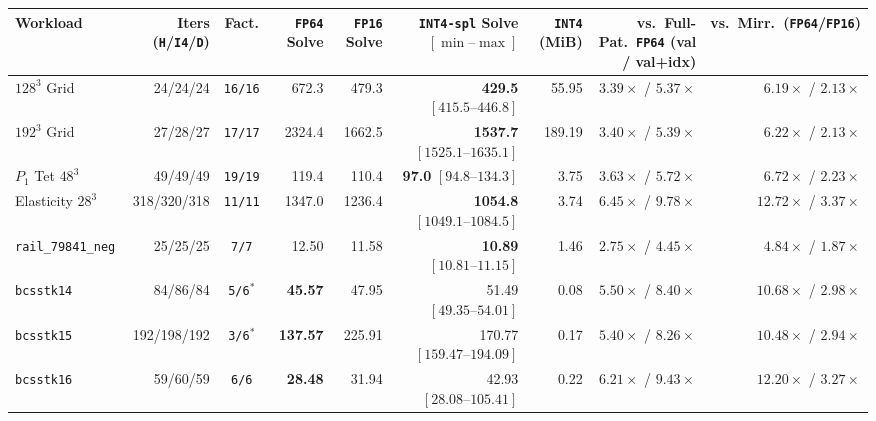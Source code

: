 \documentclass[10pt]{article}
\begin{document}
\begin{table}[t]
\centering\scriptsize
\begin{tabular}{@{}lrcrrrrrr@{}}
\toprule
Workload & Iters (\texttt{H}/\texttt{I4}/\texttt{D}) & Fact. & \texttt{FP64} Solve & \texttt{FP16} Solve & \texttt{INT4-spl} Solve $[\min\text{--}\max]$ & \texttt{INT4} (MiB) & vs.\ Full-Pat.\ \texttt{FP64} (val / val+idx) & vs.\ Mirr.\ (\texttt{FP64}/\texttt{FP16}) \\
\midrule
$128^3$ Grid & 24/24/24 & \texttt{16/16} & 672.3 & 479.3 & \textbf{429.5} $[415.5\text{--}446.8]$ & 55.95 & $\mathbf{3.39\times}$ / $\mathbf{5.37\times}$ & $6.19\times$ / $2.13\times$ \\
$192^3$ Grid & 27/28/27 & \texttt{17/17} & 2324.4 & 1662.5 & \textbf{1537.7} $[1525.1\text{--}1635.1]$ & 189.19 & $\mathbf{3.40\times}$ / $\mathbf{5.39\times}$ & $6.22\times$ / $2.13\times$ \\
$P_1$ Tet $48^3$ & 49/49/49 & \texttt{19/19} & 119.4 & 110.4 & \textbf{97.0} $[94.8\text{--}134.3]$ & 3.75 & $\mathbf{3.63\times}$ / $\mathbf{5.72\times}$ & $6.72\times$ / $2.23\times$ \\
Elasticity $28^3$ & 318/320/318 & \texttt{11/11} & 1347.0 & 1236.4 & \textbf{1054.8} $[1049.1\text{--}1084.5]$ & 3.74 & $\mathbf{6.45\times}$ / $\mathbf{9.78\times}$ & $12.72\times$ / $3.37\times$ \\
\texttt{rail\_79841\_neg} & 25/25/25 & \texttt{7/7} & 12.50 & 11.58 & \textbf{10.89} $[10.81\text{--}11.15]$ & 1.46 & $\mathbf{2.75\times}$ / $\mathbf{4.45\times}$ & $4.84\times$ / $1.87\times$ \\
\texttt{bcsstk14} & 84/86/84 & \texttt{5/6}$^*$ & \textbf{45.57} & 47.95 & 51.49 $[49.35\text{--}54.01]$ & 0.08 & $\mathbf{5.50\times}$ / $\mathbf{8.40\times}$ & $10.68\times$ / $2.98\times$ \\
\texttt{bcsstk15} & 192/198/192 & \texttt{3/6}$^*$ & \textbf{137.57} & 225.91 & 170.77 $[159.47\text{--}194.09]$ & 0.17 & $\mathbf{5.40\times}$ / $\mathbf{8.26\times}$ & $10.48\times$ / $2.94\times$ \\
\texttt{bcsstk16} & 59/60/59 & \texttt{6/6} & \textbf{28.48} & 31.94 & 42.93 $[28.08\text{--}105.41]$ & 0.22 & $\mathbf{6.21\times}$ / $\mathbf{9.43\times}$ & $12.20\times$ / $3.27\times$ \\
\bottomrule
\end{tabular}

\end{table}
\end{document}
